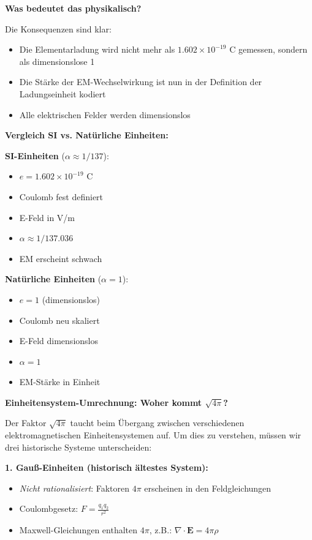 \textbf{Was bedeutet das physikalisch?}

Die Konsequenzen sind klar:
\begin{itemize}[nosep]
	\item Die Elementarladung wird nicht mehr als $1.602 \times 10^{-19}$ C gemessen, sondern als dimensionslose 1
	\item Die Stärke der EM-Wechselwirkung ist nun in der Definition der Ladungseinheit kodiert
	\item Alle elektrischen Felder werden dimensionslos
\end{itemize}

\vspace{0.5cm}
\noindent
\textbf{Vergleich SI vs. Natürliche Einheiten:}

\vspace{0.3cm}
\noindent
\begin{minipage}[t]{0.48\textwidth}
	\textbf{SI-Einheiten} ($\alpha \approx 1/137$):
	\begin{itemize}[nosep]
		\item $e = 1.602 \times 10^{-19}$ C
		\item Coulomb fest definiert
		\item E-Feld in V/m
		\item $\alpha \approx 1/137.036$
		\item EM erscheint schwach
	\end{itemize}
\end{minipage}
\hfill
\begin{minipage}[t]{0.48\textwidth}
	\textbf{Natürliche Einheiten} ($\alpha = 1$):
	\begin{itemize}[nosep]
		\item $e = 1$ (dimensionslos)
		\item Coulomb neu skaliert
		\item E-Feld dimensionslos
		\item $\alpha = 1$
		\item EM-Stärke in Einheit
	\end{itemize}
\end{minipage}
\vspace{0.5cm}

\textbf{Einheitensystem-Umrechnung: Woher kommt $\sqrt{4\pi}$?}

Der Faktor $\sqrt{4\pi}$ taucht beim Übergang zwischen verschiedenen elektromagnetischen Einheitensystemen auf. Um dies zu verstehen, müssen wir drei historische Systeme unterscheiden:

\textbf{1. Gauß-Einheiten (historisch ältestes System):}
\begin{itemize}[nosep]
	\item \textit{Nicht rationalisiert}: Faktoren $4\pi$ erscheinen in den Feldgleichungen
	\item Coulombgesetz: $F = \frac{q_1 q_2}{r^2}$
	\item Maxwell-Gleichungen enthalten $4\pi$, z.B.: $\nabla \cdot \mathbf{E} = 4\pi\rho$
\end{itemize}

